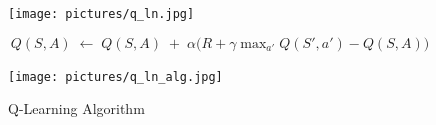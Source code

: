 \documentclass[10pt]{article}
\begin{document}
\begin{figure}[h!]
\begin{center}
\texttt{[image: pictures/q\_ln.jpg]}
\end{center}
\end{figure}

\begin{equation}
Q(S, A) \; \leftarrow \; Q(S, A) \; + \; \alpha \big( R + \gamma \mathop{\text{max}}_{a'} Q(S', a') - Q(S, A) \big)
\end{equation}

\begin{figure}[h!]
\begin{center}
\texttt{[image: pictures/q\_ln\_alg.jpg]}
\caption{Q-Learning Algorithm}
\end{center}
\end{figure}
\end{document}

